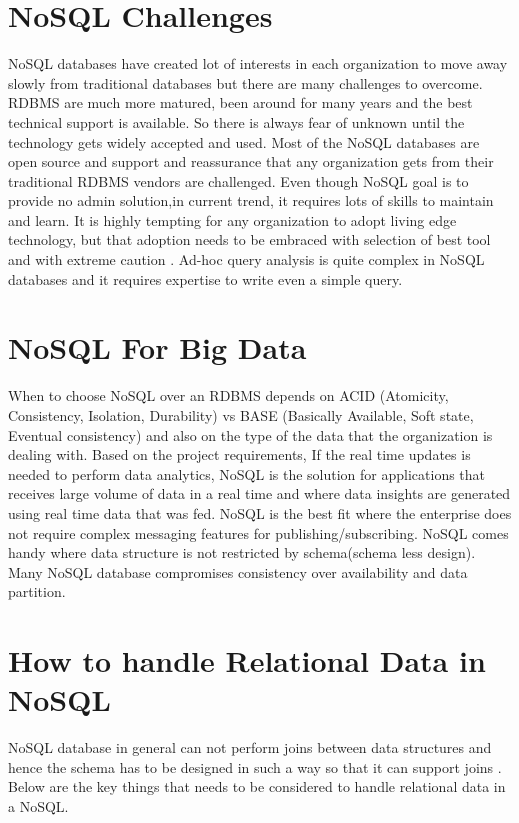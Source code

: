 \documentclass[sigconf]{acmart}
\begin{document}
\section{NoSQL Challenges}

NoSQL databases have created lot of interests in each organization to move away slowly from traditional databases but there are many challenges to overcome. RDBMS are much more matured, been around for many years and the best technical support is available. So there is always fear of unknown until the technology gets widely accepted and used. Most of the NoSQL databases are open source and support and reassurance that any organization gets from their traditional RDBMS vendors are challenged. Even though NoSQL goal is to provide no admin solution,in current trend, it requires lots of skills to maintain and learn. It is highly tempting for any organization to adopt living edge technology, but that adoption needs to be embraced with selection of best tool and with extreme caution \cite{dbkumar}. Ad-hoc query analysis is quite complex in NoSQL databases and it requires expertise to write even a simple query.

\section{NoSQL For Big Data}

When to choose NoSQL over an RDBMS depends on ACID (Atomicity, Consistency, Isolation, Durability) vs BASE (Basically Available, Soft state, Eventual consistency) and also on the type of the data that the organization is dealing with. Based on the project requirements, If the real time updates is needed to perform data analytics, NoSQL is the solution for applications that receives large volume of data in a real time and where data insights are generated using real time data that was fed. NoSQL is the best fit where the enterprise does not require complex messaging features for publishing/subscribing. NoSQL comes handy where data structure is not restricted by schema(schema less design). Many NoSQL database compromises consistency over availability and data partition.

\section{How to handle Relational Data in NoSQL}

NoSQL database in general can not perform joins between data structures and hence the schema has to be designed in such a way so that it can support joins \cite{vish}. Below are the key things that needs to be considered to handle relational data in a NoSQL.
\end{document}

